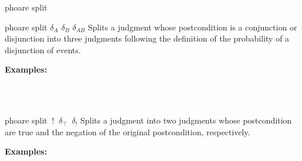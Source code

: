 \begin{tactic}{phoare split}
  \begin{tsyntax}{phoare split $\delta_{A}$ $\delta_{B}$ $\delta_{AB}$}
  Splits a \phl judgment whose postcondition is a conjunction or
  disjunction into three \phl judgments following the definition of
  the probability of a disjunction of events.

  \textbf{Examples:}
  \begin{mathpar}
    {}%
    \quad{} \\%
    {}%
    \quad{} \\%
  \end{mathpar}
  \end{tsyntax}

  \begin{tsyntax}{phoare split $\ {!}$ $\ \delta_{\top}$ $\ \delta_{!}$}
  Splits a \phl judgment into two judgments whose postcondition are
  true and the negation of the original postcondition, respectively.

  \textbf{Examples:}
  \begin{mathpar}
    {}%
    \quad{} \\%
  \end{mathpar}
  \end{tsyntax}


\end{tactic}
